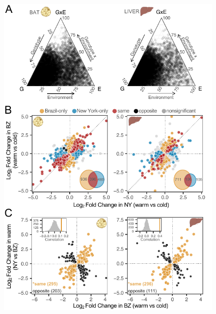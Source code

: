 \documentclass[9pt,twocolumn,twoside,lineno]{pnas-new}
\begin{document}
\begin{figure}[!t]
  \centering
  \includegraphics[width=1\columnwidth]{./figure_2.pdf}

\end{figure}
\end{document}
